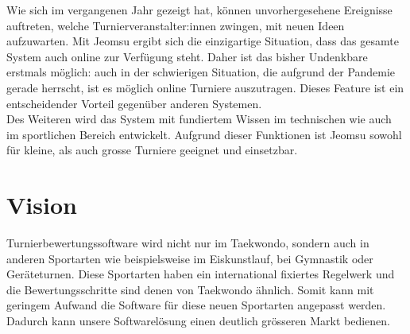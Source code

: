 Wie sich im vergangenen Jahr gezeigt hat, können unvorhergesehene Ereignisse auftreten, welche Turnierveranstalter:innen
    zwingen, mit neuen Ideen aufzuwarten.
Mit Jeomsu ergibt sich die einzigartige Situation, dass das gesamte System auch online zur Verfügung steht.
Daher ist das bisher Undenkbare erstmals möglich: auch in der schwierigen Situation, die aufgrund der Pandemie gerade
herrscht, ist es möglich online Turniere auszutragen.
Dieses Feature ist ein entscheidender Vorteil gegenüber anderen Systemen.
\\
Des Weiteren wird das System mit fundiertem Wissen im technischen wie auch im sportlichen Bereich entwickelt.
Aufgrund dieser Funktionen ist Jeomsu sowohl für kleine, als auch grosse Turniere geeignet und einsetzbar.

\section{Vision}
Turnierbewertungssoftware wird nicht nur im Taekwondo, sondern auch in anderen Sportarten wie beispielsweise im Eiskunstlauf,
    bei Gymnastik oder Geräteturnen.
Diese Sportarten haben ein international fixiertes Regelwerk und die Bewertungsschritte sind denen von Taekwondo ähnlich.
Somit kann mit geringem Aufwand die Software für diese neuen Sportarten angepasst werden.
Dadurch kann unsere Softwarelösung einen deutlich grösseren Markt bedienen.

